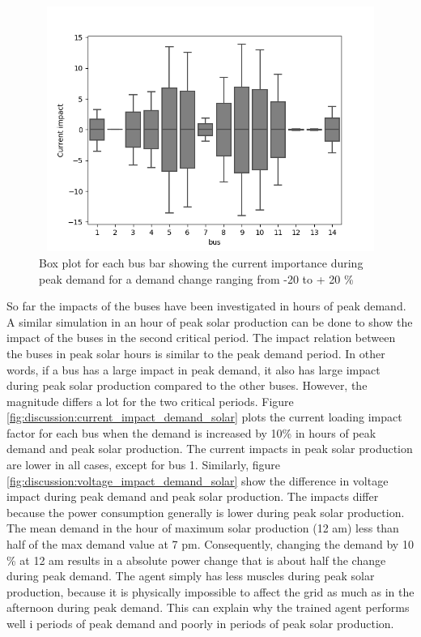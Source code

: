 \documentclass[class=book, crop=false]{standalone}
\begin{document}
\begin{figure}[h]
    \center
\includegraphics[height=8cm, width=12cm]{figures/current_impact.png}
    \caption[size = 9]{Box plot for each bus bar showing the current importance during peak demand for a demand change ranging from -20 to + 20 \%}
    \label{fig:discussion:current_impact}
\end{figure}

So far the impacts of the buses have been investigated in hours of peak demand. A similar simulation in an hour of peak solar production can be done to show the impact of the buses in the second critical period. The impact relation between the buses in peak solar hours is similar to the peak demand period. In other words, if a bus has a large impact in peak demand, it also has large impact during peak solar production compared to the other buses. However, the magnitude differs a lot for the two critical periods. Figure \ref{fig:discussion:current_impact_demand_solar} plots the current loading impact factor for each bus when the demand is increased by 10\% in hours of peak demand and peak solar production. The current impacts in peak solar production are lower in all cases, except for bus 1. Similarly, figure     \ref{fig:discussion:voltage_impact_demand_solar} show the difference in voltage impact during peak demand and peak solar production. The impacts differ because the power consumption generally is lower during peak solar production. The mean demand in the hour of maximum solar production (12 am) less than half of the max demand value at 7 pm. Consequently, changing the demand by 10 \% at 12 am results in a absolute power change that is about half the change during peak demand. The agent simply has less muscles during peak solar production, because it is physically impossible to affect the grid as much as in the afternoon during peak demand. This can explain why the trained agent performs well i periods of peak demand and poorly in periods of peak solar production.
\end{document}
